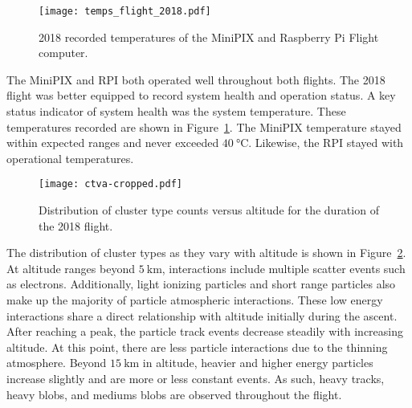 \begin{figure}[H]
\centering
\texttt{[image: temps\_flight\_2018.pdf]} %
\caption{2018 recorded temperatures of the MiniPIX and Raspberry Pi Flight computer.}
\label{fig:temps_2018}
\end{figure}
%
The MiniPIX and RPI both operated well throughout both flights.  The 2018 flight was better equipped to record system health and operation status.  A key status indicator of system health was the system temperature.  These temperatures recorded are shown in Figure~\ref{fig:temps_2018}.  The MiniPIX temperature stayed within expected ranges and never exceeded $\SI{40}{\degreeCelsius}$.  Likewise, the RPI stayed with operational temperatures.
%
%
%
\begin{figure}[H]
\centering
\texttt{[image: ctva-cropped.pdf]} %
\caption{Distribution of cluster type counts versus altitude for the duration of the 2018 flight.}
\label{fig:cluster2018}
\end{figure}
The distribution of cluster types as they vary with altitude is shown in Figure~\ref{fig:cluster2018}.  At altitude ranges beyond $\SI{5}{\kilo\meter}$, interactions include multiple scatter events such as electrons.  Additionally, light ionizing particles and short range particles also make up the majority of particle atmospheric interactions.  These low energy interactions share a direct relationship with altitude initially during the ascent.  After reaching a peak, the particle track events decrease steadily with increasing altitude.  At this point, there are less particle interactions due to the thinning atmosphere.  Beyond $\SI{15}{\kilo\meter}$ in altitude, heavier and higher energy particles increase slightly and are more or less constant events.  As such, heavy tracks, heavy blobs, and mediums blobs are observed throughout the flight.
